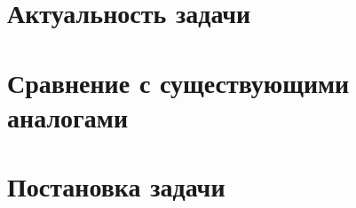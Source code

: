 
\section{Актуальность задачи}
\section{Сравнение с существующими аналогами}
\section{Постановка задачи}





